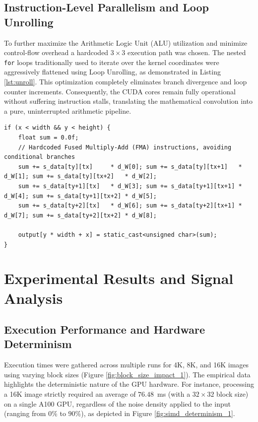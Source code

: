 \documentclass[conference]{IEEEtran}
\numberwithin{figure}{section}
\numberwithin{table}{section}
\begin{document}
\subsection*{Instruction-Level Parallelism and Loop Unrolling}
To further maximize the Arithmetic Logic Unit (ALU) utilization and minimize control-flow overhead a hardcoded $3\times3$ execution path was chosen. The nested \texttt{for} loops traditionally used to iterate over the kernel coordinates were aggressively flattened using Loop Unrolling, as demonstrated in Listing \ref{lst:unroll}. This optimization completely eliminates branch divergence and loop counter increments. Consequently, the CUDA cores remain fully operational without suffering instruction stalls, translating the mathematical convolution into a pure, uninterrupted arithmetic pipeline. 

\begin{lstlisting}[style=cppstyle, caption={Explicit loop unrolling for the 3x3 convolution kernel.}, label={lst:unroll}]
if (x < width && y < height) {
    float sum = 0.0f;
    // Hardcoded Fused Multiply-Add (FMA) instructions, avoiding conditional branches
    sum += s_data[ty][tx]     * d_W[0]; sum += s_data[ty][tx+1]   * d_W[1]; sum += s_data[ty][tx+2]   * d_W[2];
    sum += s_data[ty+1][tx]   * d_W[3]; sum += s_data[ty+1][tx+1] * d_W[4]; sum += s_data[ty+1][tx+2] * d_W[5];
    sum += s_data[ty+2][tx]   * d_W[6]; sum += s_data[ty+2][tx+1] * d_W[7]; sum += s_data[ty+2][tx+2] * d_W[8];
    
    output[y * width + x] = static_cast<unsigned char>(sum);
}
\end{lstlisting}


\section*{Experimental Results and Signal Analysis}

\subsection*{Execution Performance and Hardware Determinism}
Execution times were gathered across multiple runs for 4K, 8K, and 16K images using varying block sizes (Figure \ref{fig:block_size_impact_1}). The empirical data highlights the deterministic nature of the GPU hardware. For instance, processing a 16K image strictly required an average of $76.48$~ms (with a $32\times32$ block size) on a single A100 GPU, regardless of the noise density applied to the input (ranging from $0\%$ to $90\%$), as depicted in Figure \ref{fig:simd_determinism_1}. 
\end{document}
